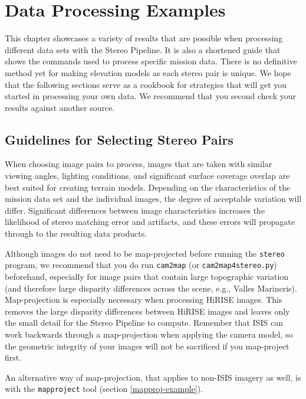 \chapter{Data Processing Examples}
\label{ch:examples}


This chapter showcases a variety of results that are possible when
processing different data sets with the Stereo Pipeline. It is also a
shortened guide that shows the commands used to process specific
mission data. There is no definitive method yet for making elevation
models as each stereo pair is unique. We hope that the following
sections serve as a cookbook for strategies that will get you started
in processing your own data. We recommend that you second check your
results against another source.

\section{Guidelines for Selecting Stereo Pairs}

When choosing image pairs to process, images that are taken with
similar viewing angles, lighting conditions, and significant surface
coverage overlap are best suited for creating terrain
models. Depending on the characteristics of the mission data set and
the individual images, the degree of acceptable variation will
differ. Significant differences between image characteristics
increases the likelihood of stereo matching error and artifacts, and
these errors will propagate through to the resulting data products.

Although images do not need to be map-projected before running the
\texttt{stereo} program, we recommend that you do run {\tt cam2map}
(or \texttt{cam2map4stereo.py})
beforehand, especially for image pairs that contain large topographic
variation (and therefore large disparity differences across the
scene, e.g., Valles Marineris).  Map-projection is especially necessary
when processing \ac{HiRISE} images. This removes the large disparity
differences between \ac{HiRISE} images and leaves only the small
detail for the Stereo Pipeline to compute. Remember that \ac{ISIS}
can work backwards through a map-projection when applying the camera
model, so the geometric integrity of your images will not be sacrificed
if you map-project first.

An alternative way of map-projection, that applies to non-ISIS imagery
as well, is with the \texttt{mapproject} tool (section
\ref{mapproj-example}).

